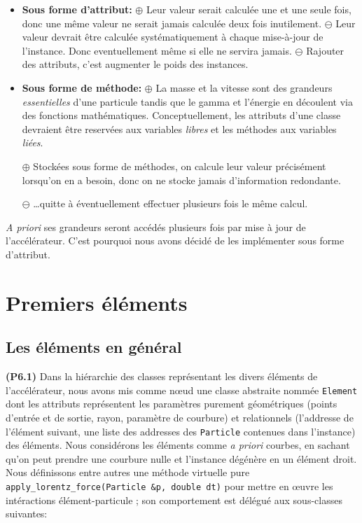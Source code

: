 \documentclass[12pt, letterpaper, twoside]{article}
\newcommand{\T}[1]{\texttt{#1}}
\begin{document}
\begin{itemize}

\item \textbf{Sous forme d'attribut:}
\subitem $\oplus$ Leur valeur serait calculée une et une seule fois, donc une même valeur ne serait jamais calculée deux fois inutilement.
\subitem $\ominus$ Leur valeur devrait être calculée systématiquement à chaque mise-à-jour de l'instance. Donc eventuellement même si elle ne servira jamais.
\subitem $\ominus$ Rajouter des attributs, c'est augmenter le poids des instances.

\item \textbf{Sous forme de méthode:}
\subitem $\oplus$ La masse et la vitesse sont des grandeurs \textit{essentielles} d'une particule tandis que le gamma et l'énergie en découlent via des fonctions mathématiques. Conceptuellement, les attributs d'une classe devraient être reservées aux variables \textit{libres} et les méthodes aux variables \textit{liées}.

\subitem $\oplus$ Stockées sous forme de méthodes, on calcule leur valeur précisément lorsqu'on en a besoin, donc on ne stocke jamais d'information redondante.

\subitem $\ominus$ \ldots quitte à éventuellement effectuer plusieurs fois le même calcul.
\end{itemize}
\bigskip
\textit{A priori} ses grandeurs seront accédés plusieurs fois par mise à jour de l'accélérateur. C'est pourquoi nous avons décidé de les implémenter sous forme d'attribut.

\section{Premiers éléments}

\subsection{Les éléments en général}
\noindent \textbf{(P6.1)} Dans la hiérarchie des classes représentant les divers éléments de l'accélérateur, nous avons mis comme nœud une classe abstraite nommée \T{Element} dont les attributs représentent les paramètres purement géométriques (points d'entrée et de sortie, rayon, paramètre de courbure) et relationnels (l'addresse de l'élément suivant, une liste des addresses des \T{Particle} contenues dans l'instance) des éléments. Nous considérons les éléments comme \textit{a priori} courbes, en sachant qu'on peut prendre une courbure nulle et l'instance dégénère en un élément droit. Nous définissons entre autres une méthode virtuelle pure \T{apply\_lorentz\_force(Particle \&p, double dt)} pour mettre en œuvre les intéractions élément-particule ; son comportement est délégué aux sous-classes suivantes:
\end{document}
